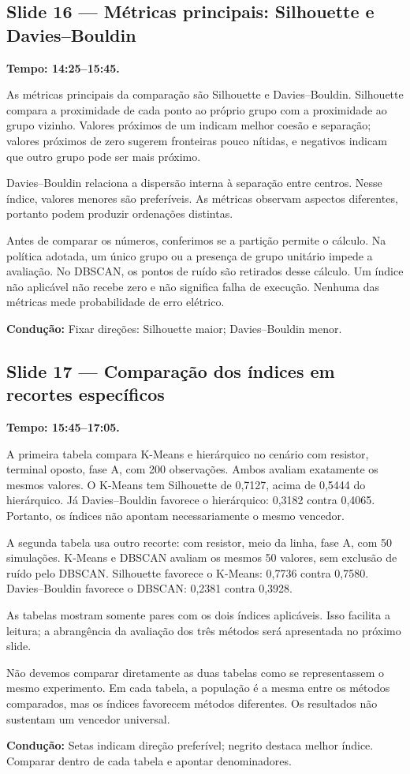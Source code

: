 \documentclass[11pt,a4paper]{article}
\newcommand{\slide}[3]{\Needspace{8\baselineskip}
  \subsection*{Slide #1 --- #2}
  \textbf{Tempo: #3.}\par}
\newcommand{\cue}[1]{\par{\small\color{accent}\textbf{Condução:} #1}\par}
\begin{document}
\slide{16}{Métricas principais: Silhouette e Davies--Bouldin}{14:25--15:45}
As métricas principais da comparação são Silhouette e Davies--Bouldin.
Silhouette compara a proximidade de cada ponto ao próprio grupo com a
proximidade ao grupo vizinho. Valores próximos de um indicam melhor
coesão e separação; valores próximos de zero sugerem fronteiras pouco
nítidas, e negativos indicam que outro grupo pode ser mais próximo.

Davies--Bouldin relaciona a dispersão interna à separação entre centros.
Nesse índice, valores menores são preferíveis. As métricas observam
aspectos diferentes, portanto podem produzir ordenações distintas.

Antes de comparar os números, conferimos se a partição permite o cálculo.
Na política adotada, um único grupo ou a presença de grupo unitário
impede a avaliação. No DBSCAN, os pontos de ruído são retirados desse
cálculo. Um índice não aplicável não recebe zero e não significa falha
de execução. Nenhuma das métricas mede probabilidade de erro elétrico.
\cue{Fixar direções: Silhouette maior; Davies--Bouldin menor.}


\slide{17}{Comparação dos índices em recortes específicos}{15:45--17:05}
A primeira tabela compara K-Means e hierárquico no cenário com resistor,
terminal oposto, fase A, com 200 observações. Ambos
avaliam exatamente os mesmos valores.
O K-Means tem Silhouette de 0,7127, acima de 0,5444 do hierárquico.
Já Davies--Bouldin favorece o hierárquico: 0,3182 contra 0,4065.
Portanto, os índices não apontam necessariamente o mesmo vencedor.

A segunda tabela usa outro recorte: com resistor, meio da linha,
fase A, com 50 simulações. K-Means e DBSCAN avaliam os mesmos 50 valores,
sem exclusão de ruído pelo DBSCAN. Silhouette favorece o K-Means:
0,7736 contra 0,7580. Davies--Bouldin favorece o DBSCAN:
0,2381 contra 0,3928.

As tabelas mostram somente pares com os dois índices aplicáveis.
Isso facilita a leitura; a abrangência da avaliação dos três métodos
será apresentada no próximo slide.

Não devemos comparar diretamente as duas tabelas como se representassem
o mesmo experimento. Em cada tabela, a população é a mesma entre os
métodos comparados, mas os índices favorecem métodos diferentes.
Os resultados não sustentam um vencedor universal.
\cue{Setas indicam direção preferível; negrito destaca melhor índice. Comparar dentro de cada tabela e apontar denominadores.}
\end{document}
